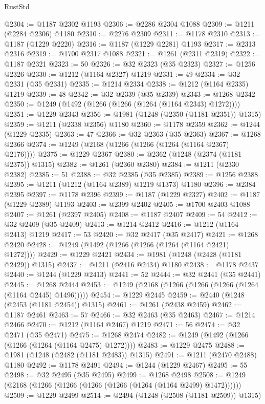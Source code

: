 \begin{lexlean}{RustStd}
\begin{coremodule}
@2304 := @1187 @2302 @1193
@2306 := @2286 @2304 @1088
@2309 := @1211 (@2284 @2306) @1180
@2310 := @2276 @2309
@2311 := @1178 @2310
@2313 := @1187 (@1229 @2220)
@2316 := @1187 (@1229 @2281) @1193
@2317 := @2313 @2316
@2319 := @1700 @2317 @1088
@2321 := @1261 (@2311 @2319)
@2322 := @1187 @2321
@2323 := 50
@2326 := @32 @2323 (@35 @2323)
@2327 := @1256 @2326
@2330 := @1212 (@1164 @2327) @1219
@2331 := 49
@2334 := @32 @2331 (@35 @2331)
@2335 := @1214 @2334
@2338 := @1212 (@1164 @2335) @1219
@2339 := 48
@2342 := @32 @2339 (@35 @2339)
@2343 := @1268 @2342
@2350 := @1249 (@1492 (@1266 (@1266 (@1264 (@1164 @2343) @1272))))
@2351 := @1229 @2343
@2356 := @1981 (@1248 (@2350 (@1181 @2351)) @1315)
@2359 := @1211 (@2338 @2356) @1180
@2360 := @1178 @2359
@2362 := @1244 (@1229 @2335)
@2363 := 47
@2366 := @32 @2363 (@35 @2363)
@2367 := @1268 @2366
@2374 := @1249 (@2168 (@1266 (@1266 (@1264 (@1164 @2367) @2176))))
@2375 := @1229 @2367
@2380 := @2362 (@1248 (@2374 (@1181 @2375)) @1315)
@2382 := @1261 (@2360 @2380)
@2384 := @1211 (@2330 @2382)
@2385 := 51
@2388 := @32 @2385 (@35 @2385)
@2389 := @1256 @2388
@2395 := @1211 (@1212 (@1164 @2389) @1219 @1373) @1180
@2396 := @2384 @2395
@2397 := @1178 @2396
@2399 := @1187 (@1229 @2327)
@2402 := @1187 (@1229 @2389) @1193
@2403 := @2399 @2402
@2405 := @1700 @2403 @1088
@2407 := @1261 (@2397 @2405)
@2408 := @1187 @2407
@2409 := 54
@2412 := @32 @2409 (@35 @2409)
@2413 := @1214 @2412
@2416 := @1212 (@1164 @2413) @1219
@2417 := 53
@2420 := @32 @2417 (@35 @2417)
@2421 := @1268 @2420
@2428 := @1249 (@1492 (@1266 (@1266 (@1264 (@1164 @2421) @1272))))
@2429 := @1229 @2421
@2434 := @1981 (@1248 (@2428 (@1181 @2429)) @1315)
@2437 := @1211 (@2416 @2434) @1180
@2438 := @1178 @2437
@2440 := @1244 (@1229 @2413)
@2441 := 52
@2444 := @32 @2441 (@35 @2441)
@2445 := @1268 @2444
@2453 := @1249 (@2168 (@1266 (@1266 (@1266 (@1264 (@1164 @2445) @1496)))))
@2454 := @1229 @2445
@2459 := @2440 (@1248 (@2453 (@1181 @2454)) @1315)
@2461 := @1261 (@2438 @2459)
@2462 := @1187 @2461
@2463 := 57
@2466 := @32 @2463 (@35 @2463)
@2467 := @1214 @2466
@2470 := @1212 (@1164 @2467) @1219
@2471 := 56
@2474 := @32 @2471 (@35 @2471)
@2475 := @1268 @2474
@2482 := @1249 (@1492 (@1266 (@1266 (@1264 (@1164 @2475) @1272))))
@2483 := @1229 @2475
@2488 := @1981 (@1248 (@2482 (@1181 @2483)) @1315)
@2491 := @1211 (@2470 @2488) @1180
@2492 := @1178 @2491
@2494 := @1244 (@1229 @2467)
@2495 := 55
@2498 := @32 @2495 (@35 @2495)
@2499 := @1268 @2498
@2508 := @1249 (@2168 (@1266 (@1266 (@1266 (@1266 (@1264 (@1164 @2499) @1472))))))
@2509 := @1229 @2499
@2514 := @2494 (@1248 (@2508 (@1181 @2509)) @1315)

\end{coremodule}
\end{lexlean}
